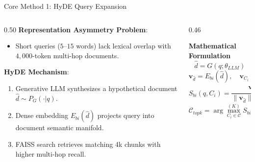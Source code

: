 \documentclass[10pt,aspectratio=169]{beamer}
\begin{document}
\begin{frame}{Core Method 1: HyDE Query Expansion}
    \begin{columns}[onlytextwidth,T]
        \begin{column}{0.50\textwidth}
            \textbf{Representation Asymmetry Problem}:
            \begin{itemize}
                \item Short queries ($5$--$15$ words) lack lexical overlap with $4,000$-token multi-hop documents.
            \end{itemize}
            
            \vspace{0.15cm}
            \textbf{HyDE Mechanism}:
            \begin{enumerate}
                \item Generative LLM synthesizes a hypothetical document $\hat{d} \sim P_G(\cdot | q)$.
                \item Dense embedding $E_{bi}(\hat{d})$ projects query into document semantic manifold.
                \item FAISS search retrieves matching 4k chunks with higher multi-hop recall.
            \end{enumerate}
        \end{column}
        
        \begin{column}{0.46\textwidth}
            \begin{exampleblock}{\textbf{Mathematical Formulation}}
                \footnotesize
                $$\hat{d} = G(q; \theta_{LLM})$$
                $$\mathbf{v}_{\hat{d}} = E_{bi}(\hat{d}), \quad \mathbf{v}_{C_i} = E_{bi}(C_i)$$
                $$S_{bi}(q, C_i) = \frac{\mathbf{v}_{\hat{d}}^\top \mathbf{v}_{C_i}}{\|\mathbf{v}_{\hat{d}}\|_2 \|\mathbf{v}_{C_i}\|_2}$$
                $$\mathcal{C}_{topk} = \arg\max_{C_i \in \mathcal{C}}^{(K)} S_{bi}(q, C_i)$$
            \end{exampleblock}
        \end{column}
    \end{columns}
\end{frame}
\end{document}
